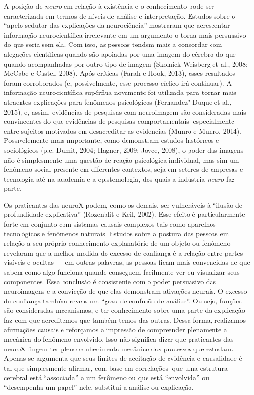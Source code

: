 A posição do \emph{neuro} em relação à existência e o conhecimento pode
ser caracterizada em termos de níveis de análise e interpretação.
Estudos sobre o ``apelo sedutor das explicações da neurociência''
mostraram que acrescentar informação neurocientífica irrelevante em um
argumento o torna mais persuasivo do que seria sem ela. Com isso, as
pessoas tendem mais a concordar com alegações científicas quando são
apoiadas por uma imagem do cérebro do que quando acompanhadas por outro
tipo de imagem (Skolnick Weisberg et al., 2008; McCabe e Castel, 2008).
Após críticas (Farah e Hook, 2013), esses resultados foram corroborados
(e, possivelmente, esse processo cíclico irá continuar). A informação
neurocientífica supérflua novamente foi utilizada para tornar mais
atraentes explicações para fenômenos psicológicos (Fernandez"-Duque et
al., 2015), e, assim, evidências de pesquisas com neuroimagem são
consideradas mais convincentes do que evidências de pesquisas
comportamentais, especialmente entre sujeitos motivados em desacreditar
as evidencias (Munro e Munro, 2014). Possivelemente mais importante,
como demonstram estudos históricos e sociológicos (p.e. Dumit, 2004;
Hagner, 2009; Joyce, 2008), o poder das imagens não é simplesmente uma
questão de reação psicológica individual, mas sim um fenômeno social
presente em diferentes contextos, seja em setores de empresas e
tecnologia até na academia e a epistemologia, dos quais a indústria
\emph{neuro} faz parte.

Os praticantes das neuroX podem, como os demais, ser vulneráveis à
``ilusão de profundidade explicativa'' (Rozenblit e Keil, 2002). Esse
efeito é particularmente forte em conjunto com sistemas causais
complexos tais como aparelhos tecnológicos e fenômenos naturais. Estudos
sobre a postura das pessoas em relação a seu próprio conhecimento
explanatório de um objeto ou fenômeno revelaram que a melhor medida do
excesso de confiança é a relação entre partes visíveis e ocultas --- em
outras palavras, as pessoas ficam mais convencidas de que sabem como
algo funciona quando conseguem facilmente ver ou visualizar seus
componentes. Essa conclusão é consistente com o poder persuasivo das
neuroimagens e a convicção de que elas demonstram ativações neurais. O
excesso de confiança também revela um ``grau de confusão de análise''.
Ou seja, funções são consideradas mecanismos, e ter conhecimento sobre
uma parte da explicação faz com que acreditemos que também temos das
outras. Dessa forma, realizamos afirmações causais e reforçamos a
impressão de compreender plenamente a mecânica do fenômeno envolvido.
Isso não significa dizer que praticantes das neuroX fingem ter pleno
conhecimento mecânico dos processos que estudam. Apenas se argumenta que
seus limites de aceitação de evidência e causalidade é tal que
simplesmente afirmar, com base em correlações, que uma estrutura
cerebral está ``associada'' a um fenômeno ou que está ``envolvida'' ou
``desempenha um papel'' nele, substitui a análise ou explicação.

